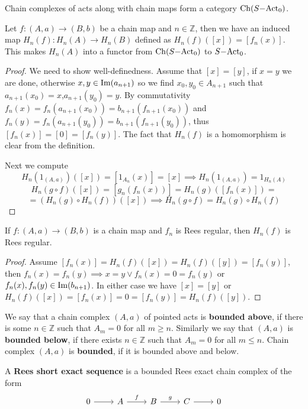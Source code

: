 \begin{proposition}
    Chain complexes of acts along with chain maps form a category $\mathrm{Ch}(S\mathrm{-Act}_0)$.
\end{proposition}
\begin{proposition}
    Let $f: (A,a) \to (B,b)$ be a chain map and $n\in\mathbb{Z}$, then we have an induced map $H_n(f) : H_n(A) \to H_n(B)$
    defined as $H_n(f)([x]) = [f_n(x)]$. This makes $H_n(A)$ into a functor from $\mathrm{Ch}(S\mathrm{-Act}_0)$ to $S\mathrm{-Act}_0$.
\end{proposition}
\begin{proof}[Proof]
    We need to show well-definedness. Assume that $[x]=[y]$, if $x=y$ we are done, otherwise $x,y\in\mathrm{Im}(a_{n+1})$ so we 
    find $x_0,y_0\in A_{n+1}$ such that $a_{n+1}(x_0) = x$,$a_{n+1}(y_0)=y$. By commutativity $f_n(x)=f_n(a_{n+1}(x_0))=b_{n+1}(f_{n+1}(x_0))$
    and $f_n(y) = f_n(a_{n+1}(y_0))=b_{n+1}(f_{n+1}(y_0))$, thus $[f_n(x)]=[0]=[f_n(y)]$. The fact that $H_n(f)$ is a homomorphism 
    is clear from the definition.\par 
    Next we compute
    \[
        H_n(1_{(A,a)})([x]) = [1_{A_n}(x)] = [x] \implies H_n(1_{(A,a)}) = 1_{H_n(A)}
    \]
    \[
        H_n(g\circ f)([x]) = [g_n(f_n(x))] = H_n(g)([f_n(x)]) =
    \]
    \[
         =(H_n(g)\circ H_n(f))([x]) \implies H_n(g\circ f) = H_n(g)\circ H_n(f)
    \]
\end{proof}
\begin{lemma}
    If $f: (A,a)\to (B,b)$ is a chain map and $f_n$ is Rees regular, then $H_n(f)$ is Rees regular.
\end{lemma}
\begin{proof}[Proof]
    Assume $[f_n(x)]=H_n(f)([x])=H_n(f)([y])=[f_n(y)]$, then $f_n(x)=f_n(y) \implies x=y \lor f_n(x)=0=f_n(y)$ or 
    $f_n(x),f_n(y)\in\mathrm{Im}(b_{n+1})$. In either case we have $[x]=[y]$ or $H_n(f)([x])=[f_n(x)]=0=[f_n(y)]=H_n(f)([y])$.
\end{proof}
\begin{definition}
    We say that a chain complex $(A,a)$ of pointed acts is \textbf{bounded above}, if there is some $n\in\mathbb{Z}$ such that 
    $A_m=0$ for all $m\geq n$. Similarly we say that $(A,a)$ is \textbf{bounded below}, if there exists $n\in\mathbb{Z}$ such that 
    $A_m=0$ for all $m\leq n$. Chain complex $(A,a)$ is \textbf{bounded}, if it is bounded above and below.
\end{definition}
\begin{definition}
    A \textbf{Rees short exact sequence} is a bounded Rees exact chain complex of the form
    \[\begin{tikzcd}
        0 & A & B & C & 0
        \arrow[from=1-1, to=1-2]
        \arrow["f", from=1-2, to=1-3]
        \arrow["g", from=1-3, to=1-4]
        \arrow[from=1-4, to=1-5]
    \end{tikzcd}\]
\end{definition}

